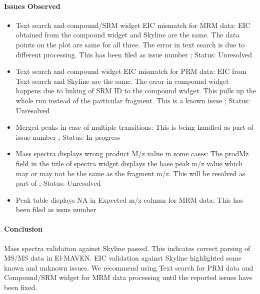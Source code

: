\documentclass[letterpaper,10pt,english,openany,oneside]{sphinxmanual}
\begin{document}
\paragraph{Issues Observed}
\label{\detokenize{LabeledMSMSValidation:issues-observed}}\begin{itemize}
\item {} 
Text search and compound/SRM widget EIC mismatch for MRM data: EIC obtained from the compound widget and Skyline are the same. The data points on the plot are same for all three. The error in text search is due to different processing. This has been filed as issue number ; Status: Unresolved

\item {} 
Text search and compound widget EIC mismatch for PRM data: EIC from Text search and Skyline are the same. The error in compound widget happens due to linking of SRM ID to the compound widget. This pulls up the whole run instead of the particular fragment. This is a known issue ; Status: Unresolved

\item {} 
Merged peaks in case of multiple transitions: This is being handled as part of issue number ; Status: In progress

\item {} 
Mass spectra displays wrong product M/z value in some cases: The prodMz field in the title of spectra widget displays the base peak m/z value which may or may not be the same as the fragment m/z. This will be resolved as part of ; Status: Unresolved

\item {} 
Peak table displays NA in Expected m/z column for MRM data: This has been filed as issue number 

\end{itemize}


\paragraph{Conclusion}
\label{\detokenize{LabeledMSMSValidation:conclusion}}
Mass spectra validation against Skyline passed. This indicates correct parsing of MS/MS data in El-MAVEN. EIC validation against Skyline highlighted some known and unknown issues. We recommend using Text search for PRM data and Compound/SRM widget for MRM data processing until the reported issues have been fixed.
\end{document}
